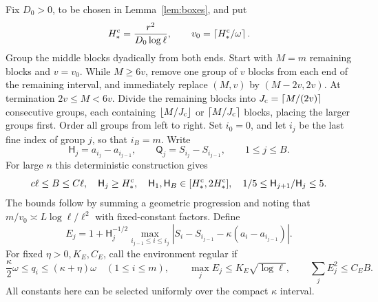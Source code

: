 \documentclass[11pt]{article}
\theoremstyle{definition}\newtheorem{definition}[theorem]{Definition}
\theoremstyle{remark}\newtheorem{remark}[theorem]{Remark}
\numberwithin{equation}{section}\allowdisplaybreaks
\begin{document}
Fix $D_0>0$, to be chosen in Lemma~\ref{lem:boxes}, and put
\begin{equation}\label{eq:base-scale}
 H_*^{\rm c}=\frac{r^2}{D_0\log\ell},\qquad
 v_0=\left\lceil H_*^{\rm c}/\omega\right\rceil.
\end{equation}
Group the middle blocks dyadically from both ends. Start with $M=m$
remaining blocks and $v=v_0$. While $M\ge6v$, remove one group of $v$
blocks from each end of the remaining interval, and immediately replace
$(M,v)$ by $(M-2v,2v)$. At termination $2v\le M<6v$. Divide the
remaining blocks into $J_{\rm c}=\lceil M/(2v)\rceil$ consecutive groups,
each containing $\lfloor M/J_{\rm c}\rfloor$ or $\lceil M/J_{\rm c}\rceil$
blocks, placing the larger groups first. Order all groups from left to
right. Set $i_0=0$, and let $i_j$ be the last fine index of group $j$,
so that $i_B=m$. Write
\[
 \mathsf H_j=a_{i_j}-a_{i_{j-1}},\qquad
 \mathsf Q_j=S_{i_j}-S_{i_{j-1}},\qquad 1\le j\le B.
\]
For large $n$ this deterministic construction gives
\begin{equation}\label{eq:dyadic}
 c\ell\le B\le C\ell,\quad
 \mathsf H_j\ge H_*^{\rm c},\quad
 \mathsf H_1,\mathsf H_B\in[H_*^{\rm c},2H_*^{\rm c}],\quad
 1/5\le\mathsf H_{j+1}/\mathsf H_j\le5.
\end{equation}
The bounds follow by summing a geometric progression and noting that
$m/v_0\asymp L\log\ell/\ell^2$ with fixed-constant factors.
Define
\begin{equation}\label{eq:environment-E}
 E_j=1+\mathsf H_j^{-1/2}
 \max_{i_{j-1}\le i\le i_j}
 |S_i-S_{i_{j-1}}-\kappa(a_i-a_{i_{j-1}})|.
\end{equation}
For fixed $\eta>0,K_E,C_E$, call the environment regular if
\begin{equation}\label{eq:regular}
 \frac\kappa2\omega\le q_i\le(\kappa+\eta)\omega\quad(1\le i\le m),
 \qquad \max_jE_j\le K_E\sqrt{\log\ell},\qquad
 \sum_jE_j^2\le C_E B.
\end{equation}
All constants here can be selected uniformly over the compact $\kappa$
interval.
\end{document}
